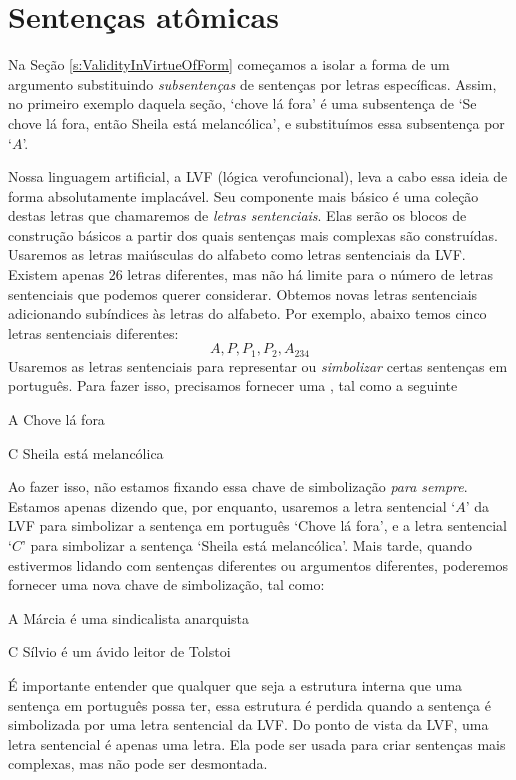 \section{Sentenças atômicas}

Na Seção \ref{s:ValidityInVirtueOfForm} começamos a isolar a forma de um argumento substituindo \emph{subsentenças} de sentenças por letras específicas.
Assim, no primeiro exemplo daquela seção, `chove lá fora' é uma subsentença de `Se chove lá fora, então Sheila está melancólica', e substituímos essa subsentença por `$A$'.

Nossa linguagem artificial, a LVF (lógica verofuncional), leva a cabo essa ideia de forma absolutamente implacável.
Seu componente mais básico é uma coleção destas letras que chamaremos de \emph{letras sentenciais}.
Elas serão os blocos de construção básicos a partir dos quais sentenças mais complexas são construídas.
Usaremos as letras maiúsculas do alfabeto como letras sentenciais da LVF.
Existem apenas 26 letras diferentes, mas não há limite para o número de letras sentenciais que podemos querer considerar.
Obtemos novas letras sentenciais adicionando subíndices às letras do alfabeto.
Por exemplo, abaixo temos cinco letras sentenciais diferentes:
	$$A, P, P_1, P_2, A_{234}$$
Usaremos as letras sentenciais para representar ou \emph{simbolizar} certas sentenças em português.
Para fazer isso, precisamos fornecer uma , tal como a seguinte
	\begin{ekey}
		\item[A] Chove lá fora
		\item[C] Sheila está melancólica
	\end{ekey}
Ao fazer isso, não estamos fixando essa chave de simbolização \emph{para sempre}.
Estamos apenas dizendo que, por enquanto, usaremos a letra sentencial `$A$'  da LVF para simbolizar a sentença em português `Chove lá fora', e a letra sentencial `$C$' para simbolizar a sentença `Sheila está melancólica'.
Mais tarde, quando estivermos lidando com sentenças diferentes ou argumentos diferentes, poderemos fornecer uma nova chave de simbolização, tal como:
	\begin{ekey}
		\item[A] Márcia é uma sindicalista anarquista
		\item[C] Sílvio é um ávido leitor de Tolstoi
	\end{ekey}
É importante entender que qualquer que seja a estrutura interna que uma sentença em português possa ter, essa estrutura é perdida quando a sentença é simbolizada por uma letra sentencial da LVF.
Do ponto de vista da LVF, uma letra sentencial é apenas uma letra.
Ela pode ser usada para criar sentenças mais complexas, mas não pode ser desmontada.

